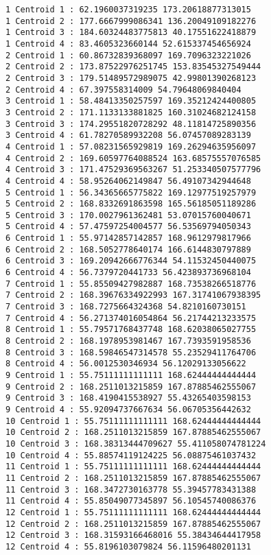 \documentclass[11pt]{article}
\begin{document}
    \begin{Verbatim}[commandchars=\\\{\}]
1 Centroid 1 : 62.1960037319235 173.20618877313015
1 Centroid 2 : 177.6667999086341 136.20049109182276
1 Centroid 3 : 184.60324483775813 40.17551622418879
1 Centroid 4 : 83.4605323660144 52.615337454656924
2 Centroid 1 : 60.86732839368097 169.7096323221026
2 Centroid 2 : 173.87522976251745 153.83545327549444
2 Centroid 3 : 179.51489572989075 42.99801390268123
2 Centroid 4 : 67.397558314009 54.79648069840404
3 Centroid 1 : 58.48413350257597 169.35212424400805
3 Centroid 2 : 171.1133133881825 160.31024682124158
3 Centroid 3 : 174.29551820728292 48.11814725890356
3 Centroid 4 : 61.78270589932208 56.07457089283139
4 Centroid 1 : 57.08231565929819 169.26294635956097
4 Centroid 2 : 169.60597764088524 163.68575557076585
4 Centroid 3 : 171.47529369563267 51.253340507577796
4 Centroid 4 : 58.95264062149847 56.49107342944648
5 Centroid 1 : 56.34365665775822 169.12977519257979
5 Centroid 2 : 168.8332691863598 165.56185051189286
5 Centroid 3 : 170.0027961362481 53.07015760040671
5 Centroid 4 : 57.47597254004577 56.53569794050343
6 Centroid 1 : 55.97142857142857 168.9612979817966
6 Centroid 2 : 168.5052778640174 166.6144830797889
6 Centroid 3 : 169.20942666776344 54.11532450440075
6 Centroid 4 : 56.7379720441733 56.423893736968104
7 Centroid 1 : 55.85509427982887 168.73538266518776
7 Centroid 2 : 168.39676334922993 167.31741067938395
7 Centroid 3 : 168.7275664324368 54.8210160730151
7 Centroid 4 : 56.271374016054864 56.21744213233575
8 Centroid 1 : 55.79571768437748 168.62038065027755
8 Centroid 2 : 168.1978953981467 167.7393591958536
8 Centroid 3 : 168.59846547314578 55.23529411764706
8 Centroid 4 : 56.0012530346934 56.12029133056622
9 Centroid 1 : 55.75111111111111 168.62444444444444
9 Centroid 2 : 168.2511013215859 167.87885462555067
9 Centroid 3 : 168.4190415538927 55.43265403598153
9 Centroid 4 : 55.92094737667634 56.06705356442632
10 Centroid 1 : 55.75111111111111 168.62444444444444
10 Centroid 2 : 168.2511013215859 167.87885462555067
10 Centroid 3 : 168.38313444709627 55.411058074781224
10 Centroid 4 : 55.88574119124225 56.08875461037432
11 Centroid 1 : 55.75111111111111 168.62444444444444
11 Centroid 2 : 168.2511013215859 167.87885462555067
11 Centroid 3 : 168.3472730163778 55.39457783431388
11 Centroid 4 : 55.85049077345897 56.10545740086376
12 Centroid 1 : 55.75111111111111 168.62444444444444
12 Centroid 2 : 168.2511013215859 167.87885462555067
12 Centroid 3 : 168.31593166468016 55.38434644417958
12 Centroid 4 : 55.8196103079824 56.11596480201131

\end{Verbatim}
\end{document}
